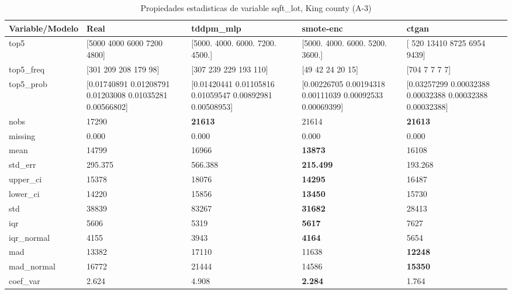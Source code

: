 \begin{table}[H]
\centering
\fontsize{8}{14}\selectfont
\caption{Propiedades  estadisticas de variable sqft\_lot, King county (A-3)}
\label{table-stats-king county-a-3-sqft_lot}
\begin{tabular}{|l|m{10em}|m{10em}|m{10em}|m{10em}|}
\hline
 \rowcolor[gray]{0.8}
Variable/Modelo & Real & tddpm\_mlp & smote-enc & ctgan \\
\hline top5 & [5000 4000 6000 7200 4800] & [5000. 4000. 6000. 7200. 4500.] & [5000. 4000. 6000. 5200. 3600.] & [  520 13410  8725  6954  9439] \\
\hline top5\_freq & [301 209 208 179  98] & [307 239 229 193 110] & [49 42 24 20 15] & [704   7   7   7   7] \\
\hline top5\_prob & [0.01740891 0.01208791 0.01203008 0.01035281 0.00566802] & [0.01420441 0.01105816 0.01059547 0.00892981 0.00508953] & [0.00226705 0.00194318 0.00111039 0.00092533 0.00069399] & [0.03257299 0.00032388 0.00032388 0.00032388 0.00032388] \\
\hline nobs & 17290 & \bfseries 21613 & \cellcolor[rgb]{0.9, 0.54, 0.52} 21614 & \bfseries 21613 \\
\hline missing & 0.000 & 0.000 & 0.000 & 0.000 \\
\hline mean & 14799 & \cellcolor[rgb]{0.9, 0.54, 0.52} 16966 & \bfseries 13873 & 16108 \\
\hline std\_err & 295.375 & \cellcolor[rgb]{0.9, 0.54, 0.52} 566.388 & \bfseries 215.499 & 193.268 \\
\hline upper\_ci & 15378 & \cellcolor[rgb]{0.9, 0.54, 0.52} 18076 & \bfseries 14295 & 16487 \\
\hline lower\_ci & 14220 & \cellcolor[rgb]{0.9, 0.54, 0.52} 15856 & \bfseries 13450 & 15730 \\
\hline std & 38839 & \cellcolor[rgb]{0.9, 0.54, 0.52} 83267 & \bfseries 31682 & 28413 \\
\hline iqr & 5606 & 5319 & \bfseries 5617 & \cellcolor[rgb]{0.9, 0.54, 0.52} 7627 \\
\hline iqr\_normal & 4155 & 3943 & \bfseries 4164 & \cellcolor[rgb]{0.9, 0.54, 0.52} 5654 \\
\hline mad & 13382 & \cellcolor[rgb]{0.9, 0.54, 0.52} 17110 & 11638 & \bfseries 12248 \\
\hline mad\_normal & 16772 & \cellcolor[rgb]{0.9, 0.54, 0.52} 21444 & 14586 & \bfseries 15350 \\
\hline coef\_var & 2.624 & \cellcolor[rgb]{0.9, 0.54, 0.52} 4.908 & \bfseries 2.284 & 1.764 \\

\end{tabular}
\end{table}
